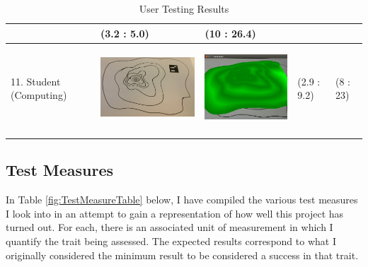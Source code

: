 \documentclass[11pt]{article}
\begin{document}
\begin{landscape}
\begin{longtable}{p{}| p{}| p{} | p{} |p{}}
							& (3.2 : 5.0)
							& (10 : 26.4)\\
\hline
11. Student (Computing) & \begin{center}\includegraphics[scale=0.5]{pics/usertesting/11.png}\end{center} 
							& \begin{center}\includegraphics[scale=0.5]{pics/usertesting/11render.png}\end{center} 
							& (2.9 : 9.2)
							& (8 : 23)\\
\hline
\caption{User Testing Results}
\label{usertestingtable}
\end{longtable}
\end{landscape}
\newpage

\subsection{Test Measures}
In Table \ref{fig:TestMeasureTable} below, I have compiled the various 
test measures I look into in an attempt to gain a representation of how 
well this project has turned out. For each, there is an associated 
unit of measurement in which I quantify the trait being assessed. 
The expected results correspond to what I originally considered the 
minimum result to be considered a success in that trait.
\end{document}
